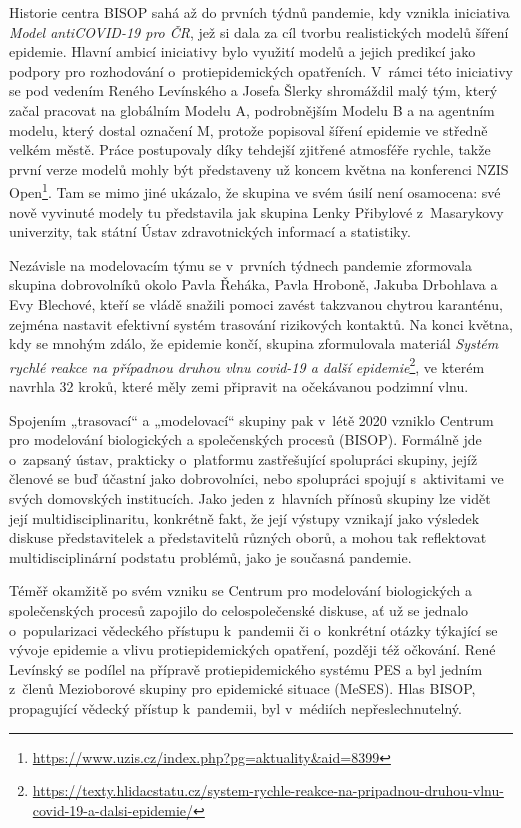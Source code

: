 Historie centra BISOP sahá až do prvních týdnů pandemie, kdy vznikla iniciativa {\em Model antiCOVID-19 pro ČR}, jež si dala za cíl tvorbu realistických modelů šíření epidemie. Hlavní ambicí iniciativy bylo využití modelů a jejich predikcí jako podpory pro rozhodování o~protiepidemických opatřeních. V~rámci této iniciativy se pod vedením Reného Levínského a Josefa Šlerky shromáždil malý tým, který začal pracovat na globálním Modelu A, podrobnějším Modelu B a na agentním modelu, který dostal označení M, protože popisoval šíření epidemie ve středně velkém městě. Práce postupovaly díky tehdejší zjitřené atmosféře rychle, takže první verze modelů mohly být představeny už koncem května na konferenci NZIS Open\footnote{\url{https://www.uzis.cz/index.php?pg=aktuality&aid=8399}}. Tam se mimo jiné ukázalo, že skupina ve svém úsilí není osamocena: své nově vyvinuté modely tu představila jak skupina Lenky Přibylové z~Masarykovy univerzity, tak státní Ústav zdravotnických informací a statistiky.


Nezávisle na modelovacím týmu se v~prvních týdnech pandemie zformovala skupina dobrovolníků okolo Pavla Řeháka, Pavla Hroboně, Jakuba Drbohlava a Evy Blechové, kteří se vládě snažili pomoci zavést takzvanou chytrou karanténu, zejména nastavit efektivní systém trasování rizikových kontaktů. Na konci května, kdy se mnohým zdálo, že epidemie končí, skupina zformulovala materiál {\em Systém rychlé reakce na případnou druhou vlnu covid-19 a další epidemie}\footnote{\url{https://texty.hlidacstatu.cz/system-rychle-reakce-na-pripadnou-druhou-vlnu-covid-19-a-dalsi-epidemie/}}, ve kterém navrhla 32 kroků, které měly zemi připravit na očekávanou podzimní vlnu.

Spojením „trasovací“ a „modelovací“ skupiny pak v~létě 2020 vzniklo Centrum pro modelování biologických a společenských procesů (BISOP).
 Formálně jde o~zapsaný ústav, prakticky o~platformu zastřešující spolupráci skupiny, jejíž členové se buď účastní jako dobrovolníci, nebo spolupráci spojují s~aktivitami ve svých domovských institucích. Jako jeden z~hlavních přínosů skupiny lze vidět její multidisciplinaritu, konkrétně fakt, že její výstupy vznikají jako výsledek diskuse představitelek a představitelů různých oborů, a mohou tak reflektovat multidisciplinární podstatu problémů, jako je současná pandemie.

 Téměř okamžitě po svém vzniku se Centrum pro modelování biologických a společenských procesů zapojilo do celospolečenské diskuse, ať už se jednalo o~popularizaci vědeckého přístupu k~pandemii či o~konkrétní otázky týkající se vývoje epidemie a vlivu protiepidemických opatření, později též očkování. René Levínský se podílel na přípravě protiepidemického systému PES a byl jedním z~členů Mezioborové skupiny pro epidemické situace (MeSES). Hlas BISOP, propagující vědecký přístup k~pandemii, byl v~médiích nepřeslechnutelný.

